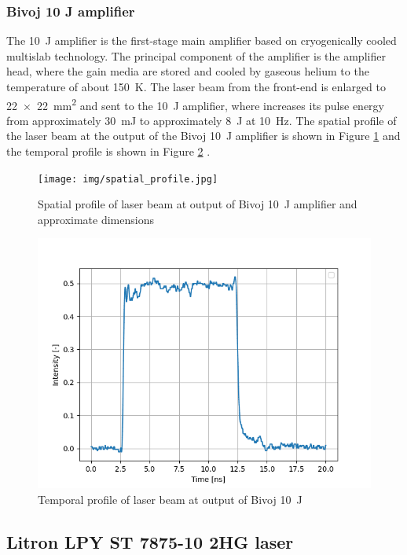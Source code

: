 \subsubsection*{Bivoj 10 J amplifier}

The \SI{10}{\joule}  amplifier is the first-stage main amplifier based on
cryogenically cooled multislab technology. The principal
component of the amplifier is the amplifier head, where the
gain media are stored and cooled by gaseous helium to 
the temperature of about \SI{150}{\kelvin}. The laser beam from the front-end
is enlarged to \SI{22 x 22}{\mm\squared} and sent to the \SI{10}{\joule} amplifier, where
increases its pulse energy from approximately \SI{30}{\milli\joule} to
approximately \SI{8}{\joule} at \SI{10}{\hertz}. The spatial profile of the laser beam at the output of the Bivoj \SI{10}{\joule} amplifier is shown in Figure \ref{fig:spatialprofile} and the temporal profile is shown in Figure \ref{fig:temporalprofile} \cite{saumyabrata}.

\begin{figure}[h]
    \centering
    \texttt{[image: img/spatial\_profile.jpg]}
    \caption{Spatial profile of laser beam at output of Bivoj \SI{10}{\joule} amplifier and approximate dimensions \protect\cite{kaufman}}
    \label{fig:spatialprofile}
\end{figure}

\begin{figure}[h]
    \centering
    \includegraphics[width=0.6\linewidth]{img/bivoj_temp.png}
    \caption{Temporal profile of laser beam at output of Bivoj \SI{10}{\joule} \protect\cite{kaufman}}
    \label{fig:temporalprofile}
\end{figure}

\subsection{Litron LPY ST 7875-10 2HG laser}

